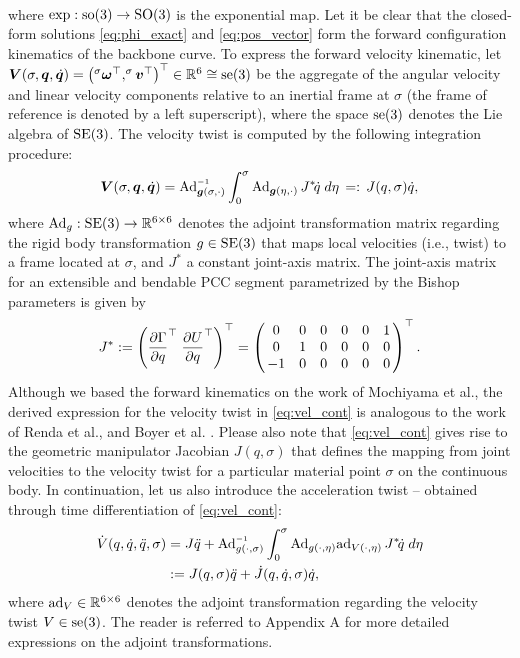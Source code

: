 {\begin{align}
\end{align}
%
where $\exp: {\text{so}(3)} \to {\text{SO}(3)}$ is the exponential map. Let it be clear that the closed-form solutions \eqref{eq:phi_exact} and \eqref{eq:pos_vector} form the forward configuration kinematics of the backbone curve. To express the forward velocity kinematic, let  $\boldsymbol{V}(\sigma,\boldsymbol{q},\dot{\boldsymbol{q}}) = \left(^\sigma \boldsymbol{\omega}^\top,^\sigma \boldsymbol{v}^\top \right)^\top \in \mathbb{R}^6 \cong {\text{se}(3)}
$ be the aggregate of the angular velocity and linear velocity components relative to an inertial frame at $\sigma$ (the frame of reference is denoted by a left superscript), where the space ${\text{se}(3)}$ denotes the Lie algebra of ${\text{SE}(3)}$. The velocity twist is computed by the following integration procedure:
%
\begin{equation}
 \vec{V}(\sigma,\vec{q},\dot{\vec{q}}) = \Ad_{\mat{g}(\sigma,\cdot)}\inv \int_0^\sigma \Ad_{\mat{g}(\eta,\cdot)}\, J^*\! \dot{q}\;d\eta
 \,=:\, J(q,\sigma) \dot{q}, \label{eq:vel_cont}
\end{equation}
%
where $\text{Ad}_g: {\text{SE}(3)} \to \mathbb{R}^{6\times 6}$ denotes the adjoint transformation matrix regarding the rigid body transformation $g \in {\text{SE}(3)}$ that maps local velocities (i.e., twist) to a frame located at $\sigma$, and $J^*$ a constant joint-axis matrix. The joint-axis matrix for an extensible and bendable PCC segment parametrized by the Bishop parameters is given by
%
\begin{equation}
\renewcommand*{\arraystretch}{1}{}
J^* := \left(\dfrac{\p \Gamma}{\p q}^\top \; \dfrac{\p U}{\p q}^\top \right)^\top = \begin{pmatrix}
\,0 & 0 & 0 & 0 & 0 & 1 \, \\
\,0 & 1 & 0 & 0 & 0 & 0 \,  \\
\,-1 & 0 & 0 & 0 & 0 & 0 \,  \\
\end{pmatrix}^\top. \label{eq:joint-axis-matrix}
\end{equation}
%
Although we based the forward kinematics on the work of Mochiyama et al.\cite{Mochiyama2003}, the derived expression for the velocity twist in \eqref{eq:vel_cont} is analogous to the work of Renda et al.\cite{Renda2018,Renda2020}, and Boyer et al. \cite{Boyer2010,Boyer2021}. Please also note that \eqref{eq:vel_cont} gives rise to the geometric manipulator Jacobian $J(q,\sigma)
$ that defines the mapping from joint velocities to the velocity twist for a particular material point $\sigma$ on the continuous body. In continuation, let us also introduce the acceleration twist\cite{Boyer2021,Mochiyama2003,Renda2018} -- obtained through time differentiation of \eqref{eq:vel_cont}:
%
\begin{align}
\dot{V}(q,\dot{q},\ddot{q},\sigma) & = J \ddot{q} + \Ad_{g(\cdot,\sigma)} \inv \int_0^\sigma \Ad_{g(\cdot,\eta)}
\ad_{V(\cdot,\eta)} \, J^*\! \dot{q}\;d\eta \notag \\
& := J(q,\sigma)\ddot{q} + \dot{J}(q,\dot{q},\sigma) \dot{q},
\label{eq:acceleration}
\end{align}
%
where $\text{ad}_{V} \in \mathbb{R}^{6\times 6}$ denotes the adjoint transformation regarding the velocity twist $V \in {\text{se}(3)}$. The reader is referred to Appendix A for more detailed expressions on the adjoint transformations.
%
}

